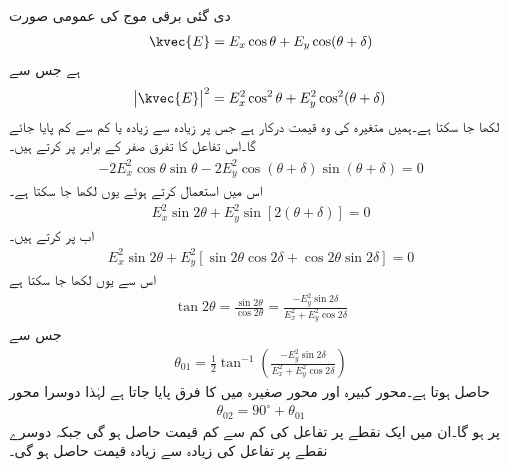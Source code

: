دی گئی برقی موج کی عمومی صورت
\begin{align}
\kvec{E}=E_x \cos \theta+E_y\cos(\theta+\delta)
\end{align}
ہے جس سے
\begin{align*}
\abs{\kvec{E}}^2=E_x^2 \cos^2 \theta +E_y^2 \cos^2(\theta+\delta)
\end{align*}
لکھا جا سکتا ہے۔ہمیں متغیرہ  کی وہ قیمت درکار ہے جس پر  زیادہ سے زیادہ یا کم سے کم پایا جائے گا۔اس تفاعل کا تفرق صفر کے برابر پر کرتے ہیں۔
\begin{align*}
-2 E_x^2 \cos \theta \sin \theta -2 E_y^2 \cos(\theta+\delta) \sin(\theta+\delta)=0 
\end{align*}
اس میں  استعمال کرتے  ہوئے یوں لکھا جا سکتا ہے۔
\begin{align*}
E_x^2 \sin 2\theta+E_y^2 \sin[2(\theta+\delta)]=0
\end{align*}
اب  پر کرتے ہیں۔
\begin{align*}
E_x^2 \sin 2\theta +E_y^2 [\sin 2 \theta \cos 2 \delta +\cos 2 \theta \sin 2 \delta]=0
\end{align*}
اس سے یوں لکھا جا سکتا ہے
\begin{align*}
\tan 2 \theta =\frac{\sin 2 \theta}{\cos 2 \theta}=\frac{-E_y^2 \sin 2 \delta}{E_x^2+E_y^2 \cos 2 \delta}
\end{align*}
جس سے
\begin{align}\label{مساوات_قطبیت_رداس_الف}
\theta_{01}=\frac{1}{2} \tan^{-1}\left( \frac{-E_y^2 \sin 2 \delta}{E_x^2+E_y^2 \cos 2 \delta}\right)
\end{align}
حاصل ہوتا ہے۔محور کبیرہ اور محور صغیرہ میں  کا فرق پایا جاتا ہے لہٰذا دوسرا محور
\begin{align}\label{مساوات_قطبیت_رداس_ب}
\theta_{02}=90^{\circ}+\theta_{01}
\end{align}
پر ہو گا۔ان میں ایک نقطے پر تفاعل کی کم سے کم قیمت حاصل ہو گی جبکہ دوسرے نقطے پر تفاعل کی زیادہ سے زیادہ قیمت حاصل ہو گی۔

